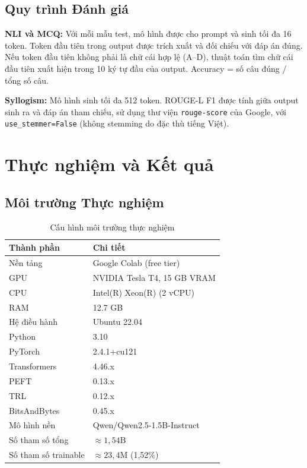 \documentclass[fontsize=13pt,a4paper,oneside,DIV=calc,chapterprefix=true]{scrbook}
\begin{document}
\section{Quy trình Đánh giá}

\textbf{NLI và MCQ:} Với mỗi mẫu test, mô hình được cho prompt và sinh tối đa 16 token. Token
đầu tiên trong output được trích xuất và đối chiếu với đáp án đúng. Nếu token đầu tiên không
phải là chữ cái hợp lệ (A--D), thuật toán tìm chữ cái đầu tiên xuất hiện trong 10 ký tự đầu
của output. Accuracy = số câu đúng / tổng số câu.

\textbf{Syllogism:} Mô hình sinh tối đa 512 token. ROUGE-L F1 được tính giữa output sinh ra
và đáp án tham chiếu, sử dụng thư viện \texttt{rouge-score} của Google, với \texttt{use\_stemmer=False}
(không stemming do đặc thù tiếng Việt).

\chapter{Thực nghiệm và Kết quả}
\label{chap:results}

\section{Môi trường Thực nghiệm}

\begin{table}[H]
\centering
\caption{Cấu hình môi trường thực nghiệm}
\label{tab:env}
\begin{tabular}{ll}
\toprule
\textbf{Thành phần} & \textbf{Chi tiết} \\
\midrule
Nền tảng & Google Colab (free tier) \\
GPU & NVIDIA Tesla T4, 15 GB VRAM \\
CPU & Intel(R) Xeon(R) (2 vCPU) \\
RAM & 12.7 GB \\
Hệ điều hành & Ubuntu 22.04 \\
Python & 3.10 \\
PyTorch & 2.4.1+cu121 \\
Transformers & 4.46.x \\
PEFT & 0.13.x \\
TRL & 0.12.x \\
BitsAndBytes & 0.45.x \\
\midrule
Mô hình nền & Qwen/Qwen2.5-1.5B-Instruct \\
Số tham số tổng & $\approx 1{,}54\text{B}$ \\
Số tham số trainable & $\approx 23{,}4\text{M}$ (1,52\%) \\
\bottomrule
\end{tabular}
\end{table}
\end{document}
